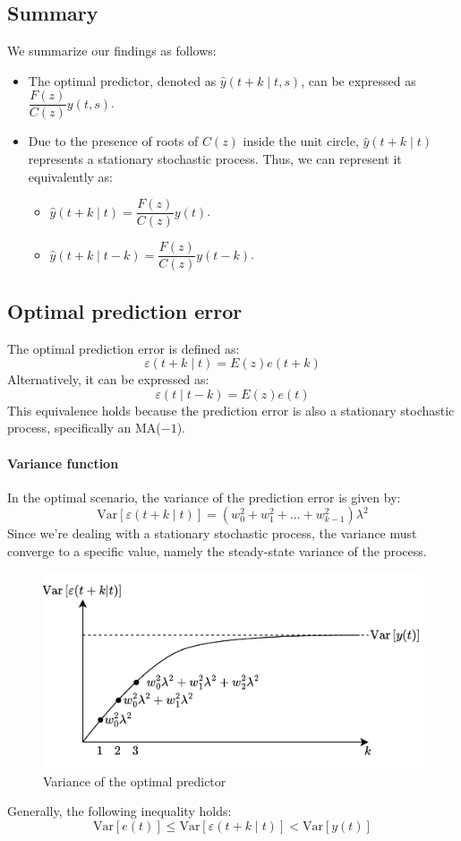 \subsection{Summary}
We summarize our findings as follows:
\begin{itemize}
    \item The optimal predictor, denoted as $\hat{y}(t+k\mid t,s)$, can be expressed as $\dfrac{F(z)}{C(z)}y(t,s)$. 
    \item Due to the presence of roots of $C(z)$ inside the unit circle, $\hat{y}(t+k\mid t)$ represents a stationary stochastic process.
        Thus, we can represent it equivalently as:
        \begin{itemize}
            \item $\hat{y}(t+k\mid t)=\dfrac{F(z)}{C(z)}y(t)$. 
            \item $\hat{y}(t+k\mid t-k)=\dfrac{F(z)}{C(z)}y(t-k)$. 
        \end{itemize}
\end{itemize}

\subsection{Optimal prediction error}
The optimal prediction error is defined as:
\[\varepsilon(t+k\mid t)=E(z)e(t+k)\]
Alternatively, it can be expressed as:
\[\varepsilon(t\mid t-k)=E(z)e(t)\]
This equivalence holds because the prediction error is also a stationary stochastic process, specifically an MA($-1$).

\paragraph*{Variance function}
In the optimal scenario, the variance of the prediction error is given by:
\[\text{Var}\left[\varepsilon(t+k\mid t)\right]=\left(w_0^2+w_1^2+\dots+w_{k-1}^2\right)\lambda^2\]
Since we're dealing with a stationary stochastic process, the variance must converge to a specific value, namely the steady-state variance of the process.
\begin{figure}[H]
    \centering
    \includegraphics[width=0.75\linewidth]{images/var.png}
    \caption{Variance of the optimal predictor}
\end{figure}
Generally, the following inequality holds:
\[\text{Var}\left[e(t)\right] \leq \text{Var}\left[\varepsilon(t+k\mid t)\right] < \text{Var}\left[y(t)\right]\]